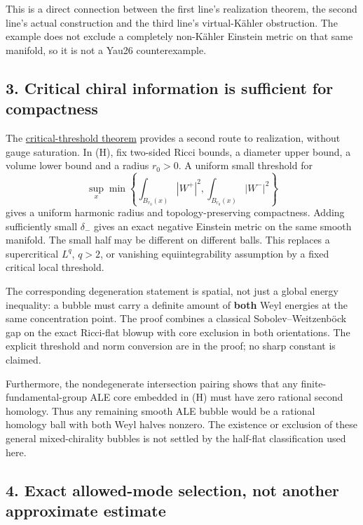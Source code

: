 \documentclass[
  11pt,
]{article}
\begin{document}
This is a direct connection between the first line's realization
theorem, the second line's actual construction and the third line's
virtual-Kähler obstruction. The example does not exclude a completely
non-Kähler Einstein metric on that same manifold, so it is not a Yau26
counterexample.

\hypertarget{critical-chiral-information-is-sufficient-for-compactness}{%
\subsection{3. Critical chiral information is sufficient for
compactness}\label{critical-chiral-information-is-sufficient-for-compactness}}

The \href{20260923_critical_chiral_threshold.md}{critical-threshold
theorem} provides a second route to realization, without gauge
saturation. In (H), fix two-sided Ricci bounds, a diameter upper bound,
a volume lower bound and a radius \(r_0>0\). A uniform small threshold
for \[
 \sup_x\min\left\{
        \int_{B_{r_0}(x)}|W^+|^2,
        \int_{B_{r_0}(x)}|W^-|^2\right\}                    \tag{5}
\] gives a uniform harmonic radius and topology-preserving compactness.
Adding sufficiently small \(\delta_-\) gives an exact negative Einstein
metric on the same smooth manifold. The small half may be different on
different balls. This replaces a supercritical \(L^q\), \(q>2\), or
vanishing equiintegrability assumption by a fixed critical local
threshold.

The corresponding degeneration statement is spatial, not just a global
energy inequality: a bubble must carry a definite amount of
\textbf{both} Weyl energies at the same concentration point. The proof
combines a classical Sobolev--Weitzenböck gap on the exact Ricci-flat
blowup with core exclusion in both orientations. The explicit threshold
and norm conversion are in the proof; no sharp constant is claimed.

Furthermore, the nondegenerate intersection pairing shows that any
finite- fundamental-group ALE core embedded in (H) must have zero
rational second homology. Thus any remaining smooth ALE bubble would be
a rational homology ball with both Weyl halves nonzero. The existence or
exclusion of these general mixed-chirality bubbles is not settled by the
half-flat classification used here.

\hypertarget{exact-allowed-mode-selection-not-another-approximate-estimate}{%
\subsection{4. Exact allowed-mode selection, not another approximate
estimate}\label{exact-allowed-mode-selection-not-another-approximate-estimate}}
\end{document}
